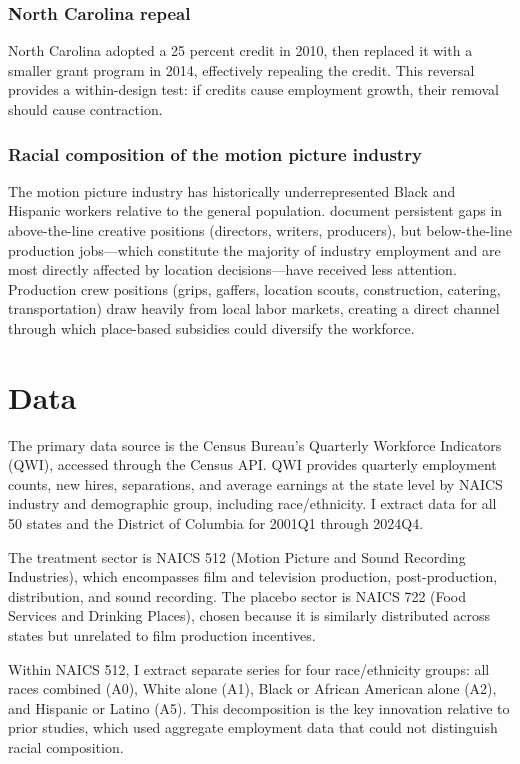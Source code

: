 \documentclass[12pt]{article}
\begin{document}
\subsubsection*{North Carolina repeal} North Carolina adopted a 25 percent credit in 2010, then replaced it with a smaller grant program in 2014, effectively repealing the credit. This reversal provides a within-design test: if credits cause employment growth, their removal should cause contraction.

\subsubsection*{Racial composition of the motion picture industry} The motion picture industry has historically underrepresented Black and Hispanic workers relative to the general population. \citet{Hunt2020} document persistent gaps in above-the-line creative positions (directors, writers, producers), but below-the-line production jobs---which constitute the majority of industry employment and are most directly affected by location decisions---have received less attention. Production crew positions (grips, gaffers, location scouts, construction, catering, transportation) draw heavily from local labor markets, creating a direct channel through which place-based subsidies could diversify the workforce.

\section{Data}

The primary data source is the Census Bureau's Quarterly Workforce Indicators (QWI), accessed through the Census API. QWI provides quarterly employment counts, new hires, separations, and average earnings at the state level by NAICS industry and demographic group, including race/ethnicity. I extract data for all 50 states and the District of Columbia for 2001Q1 through 2024Q4.

The treatment sector is NAICS 512 (Motion Picture and Sound Recording Industries), which encompasses film and television production, post-production, distribution, and sound recording. The placebo sector is NAICS 722 (Food Services and Drinking Places), chosen because it is similarly distributed across states but unrelated to film production incentives.

Within NAICS 512, I extract separate series for four race/ethnicity groups: all races combined (A0), White alone (A1), Black or African American alone (A2), and Hispanic or Latino (A5). This decomposition is the key innovation relative to prior studies, which used aggregate employment data that could not distinguish racial composition.
\end{document}
